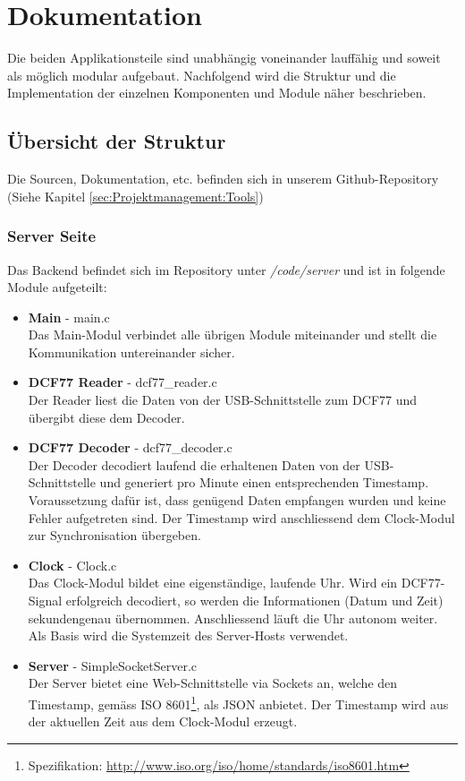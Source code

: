 
\chapter{Dokumentation}
Die beiden Applikationsteile sind unabhängig voneinander lauffähig und soweit als möglich modular aufgebaut. Nachfolgend wird die Struktur und die Implementation der einzelnen Komponenten und Module näher beschrieben.

\section{Übersicht der Struktur}
Die Sourcen, Dokumentation, etc. befinden sich in unserem Github-Repository (Siehe Kapitel \ref{sec:Projektmanagement:Tools})
\subsection{Server Seite}
Das Backend befindet sich im Repository unter \textit{/code/server} und ist in folgende Module aufgeteilt:

\begin{itemize}
\item {\textbf{Main} - main.c} \\
Das Main-Modul verbindet alle übrigen Module miteinander und stellt die Kommunikation untereinander sicher.

\item {\textbf{DCF77 Reader} - dcf77\_reader.c} \\
Der Reader liest die Daten von der USB-Schnittstelle zum DCF77 und übergibt diese dem Decoder.

\item {\textbf{DCF77 Decoder} - dcf77\_decoder.c}\\
Der Decoder decodiert laufend die erhaltenen Daten von der USB-Schnittstelle und generiert pro Minute einen entsprechenden Timestamp. Voraussetzung dafür ist, dass  genügend Daten empfangen wurden und keine Fehler aufgetreten sind. Der Timestamp wird anschliessend dem Clock-Modul zur Synchronisation übergeben.

\item {\textbf{Clock} - Clock.c}\\
Das Clock-Modul bildet eine eigenständige, laufende Uhr. Wird ein DCF77-Signal erfolgreich decodiert, so werden die Informationen (Datum und Zeit) sekundengenau übernommen. Anschliessend läuft die Uhr autonom weiter. Als Basis wird die Systemzeit des Server-Hosts verwendet.

\item {\textbf{Server} - SimpleSocketServer.c}\\
Der Server bietet eine Web-Schnittstelle via Sockets an, welche den Timestamp, gemäss ISO 8601\footnote{Spezifikation: \url{http://www.iso.org/iso/home/standards/iso8601.htm}}, als JSON anbietet. Der Timestamp wird aus der aktuellen Zeit aus dem Clock-Modul erzeugt.

\end{itemize} 

